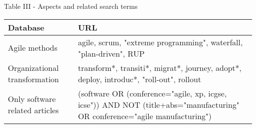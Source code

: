 \centering
Table III - Aspects and related search terms

\begin{tabular}{p{13em} p{30em}}
    \bfseries{Database} & \bfseries{URL} \\
    \hline
    Agile methods & agile, scrum, "extreme programming", waterfall, "plan-driven", RUP \\
    Organizational transformation & transform*, transiti*, migrat*, journey, adopt*, deploy, introduc*, "roll-out", rollout \\
    Only software related articles & (software OR (conference="agile, xp, icgse, icse")) AND NOT (title+abs="manufacturing" OR conference="agile manufacturing") \\
    \hline
\end{tabular}

\raggedright
